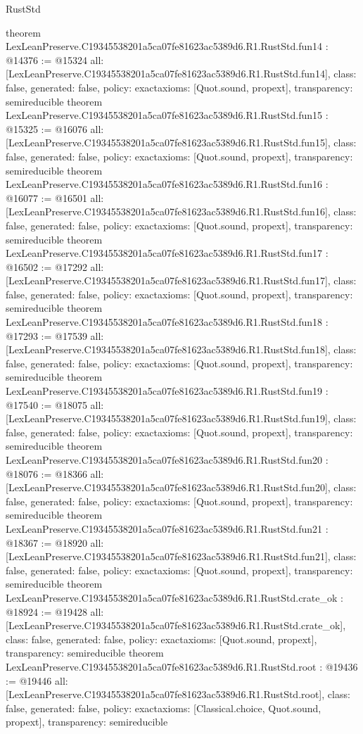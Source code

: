 \begin{lexlean}{RustStd}
\begin{coremodule}
{}
theorem LexLeanPreserve.C19345538201a5ca07fe81623ac5389d6.R1.RustStd.fun14 : @14376 := @15324 {
  all: [LexLeanPreserve.C19345538201a5ca07fe81623ac5389d6.R1.RustStd.fun14],
  class: false,
  generated: false,
  policy: exact{axioms: [Quot.sound, propext]},
  transparency: semireducible
}
theorem LexLeanPreserve.C19345538201a5ca07fe81623ac5389d6.R1.RustStd.fun15 : @15325 := @16076 {
  all: [LexLeanPreserve.C19345538201a5ca07fe81623ac5389d6.R1.RustStd.fun15],
  class: false,
  generated: false,
  policy: exact{axioms: [Quot.sound, propext]},
  transparency: semireducible
}
theorem LexLeanPreserve.C19345538201a5ca07fe81623ac5389d6.R1.RustStd.fun16 : @16077 := @16501 {
  all: [LexLeanPreserve.C19345538201a5ca07fe81623ac5389d6.R1.RustStd.fun16],
  class: false,
  generated: false,
  policy: exact{axioms: [Quot.sound, propext]},
  transparency: semireducible
}
theorem LexLeanPreserve.C19345538201a5ca07fe81623ac5389d6.R1.RustStd.fun17 : @16502 := @17292 {
  all: [LexLeanPreserve.C19345538201a5ca07fe81623ac5389d6.R1.RustStd.fun17],
  class: false,
  generated: false,
  policy: exact{axioms: [Quot.sound, propext]},
  transparency: semireducible
}
theorem LexLeanPreserve.C19345538201a5ca07fe81623ac5389d6.R1.RustStd.fun18 : @17293 := @17539 {
  all: [LexLeanPreserve.C19345538201a5ca07fe81623ac5389d6.R1.RustStd.fun18],
  class: false,
  generated: false,
  policy: exact{axioms: [Quot.sound, propext]},
  transparency: semireducible
}
theorem LexLeanPreserve.C19345538201a5ca07fe81623ac5389d6.R1.RustStd.fun19 : @17540 := @18075 {
  all: [LexLeanPreserve.C19345538201a5ca07fe81623ac5389d6.R1.RustStd.fun19],
  class: false,
  generated: false,
  policy: exact{axioms: [Quot.sound, propext]},
  transparency: semireducible
}
theorem LexLeanPreserve.C19345538201a5ca07fe81623ac5389d6.R1.RustStd.fun20 : @18076 := @18366 {
  all: [LexLeanPreserve.C19345538201a5ca07fe81623ac5389d6.R1.RustStd.fun20],
  class: false,
  generated: false,
  policy: exact{axioms: [Quot.sound, propext]},
  transparency: semireducible
}
theorem LexLeanPreserve.C19345538201a5ca07fe81623ac5389d6.R1.RustStd.fun21 : @18367 := @18920 {
  all: [LexLeanPreserve.C19345538201a5ca07fe81623ac5389d6.R1.RustStd.fun21],
  class: false,
  generated: false,
  policy: exact{axioms: [Quot.sound, propext]},
  transparency: semireducible
}
theorem LexLeanPreserve.C19345538201a5ca07fe81623ac5389d6.R1.RustStd.crate_ok : @18924 := @19428 {
  all: [LexLeanPreserve.C19345538201a5ca07fe81623ac5389d6.R1.RustStd.crate_ok],
  class: false,
  generated: false,
  policy: exact{axioms: [Quot.sound, propext]},
  transparency: semireducible
}
theorem LexLeanPreserve.C19345538201a5ca07fe81623ac5389d6.R1.RustStd.root : @19436 := @19446 {
  all: [LexLeanPreserve.C19345538201a5ca07fe81623ac5389d6.R1.RustStd.root],
  class: false,
  generated: false,
  policy: exact{axioms: [Classical.choice, Quot.sound, propext]},
  transparency: semireducible
}


\end{coremodule}
\end{lexlean}
